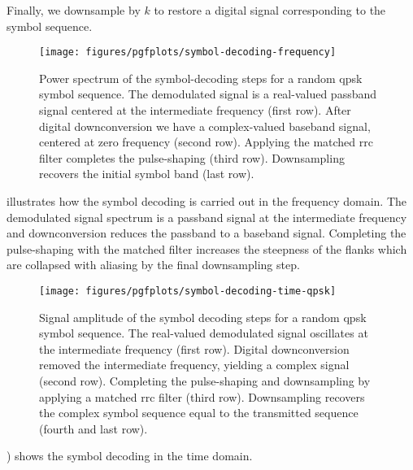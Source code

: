 Finally, we downsample by $k$ to restore a digital signal corresponding to the symbol sequence.
\begin{figure}[htb]
	\centering
	\texttt{[image: figures/pgfplots/symbol-decoding-frequency]}
	\caption{Power spectrum of the symbol-decoding steps for a random \gls{qpsk} symbol sequence. The demodulated signal is a real-valued passband signal centered at the intermediate frequency (first row). After digital downconversion we have a complex-valued baseband signal, centered at zero frequency (second row). Applying the matched \gls{rrc} filter completes the pulse-shaping (third row). Downsampling recovers the initial symbol band (last row).}\label{fig:symbol_decoding_frequency}
\end{figure}
 illustrates how the symbol decoding is carried out in the frequency domain.
The demodulated signal spectrum is a passband signal at the intermediate frequency and downconversion reduces the passband to a baseband signal.
Completing the pulse-shaping with the matched filter increases the steepness of the flanks which are collapsed with aliasing by the final downsampling step.
\begin{figure}[htb]
	\centering
	\texttt{[image: figures/pgfplots/symbol-decoding-time-qpsk]}
	\caption{Signal amplitude of the symbol decoding steps for a random \gls{qpsk} symbol sequence. The real-valued demodulated signal oscillates at the intermediate frequency (first row). Digital downconversion removed the intermediate frequency, yielding a complex signal (second row). Completing the pulse-shaping and downsampling by applying a matched \gls{rrc} filter (third row). Downsampling recovers the complex symbol sequence equal to the transmitted sequence (fourth and last row).}\label{fig:symbol_decoding_time}
\end{figure}
) shows the symbol decoding in the time domain.